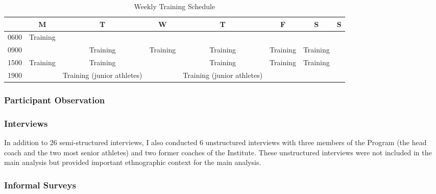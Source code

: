 \begin{CJK}{UTF8}{gbsn}
  \begin{landscape}
    \begin{table}[htpb]\caption{Weekly Training Schedule}
      \begin{center}
        \begin{small}
            \begin{tabular}{| c | c | c | c | c | c | c | c |}
              \hline
              & \bf M & \bf T & \bf W & \bf T & \bf F & \bf S & \bf S \\
              \hline
              0600 & Training &  &  & & & & \\
              \hline
              0900 &  & Training & Training & Training & Training & Training &  \\
                \hline
              1500 & Training & Training & & Training & Training & Training &  \\
                \hline
              1900 &  & Training (junior athletes) & & Training (junior athletes) & & & \\
                 \hline
            \end{tabular}
                \label{tab:tournamentData}
          \end{small}
        \end{center}
      \end{table}
  \end{landscape}
  \restoregeometry




\subsubsection{Participant Observation}

  \subsubsection{Interviews}

  In addition to 26 semi-structured interviews, I also conducted 6 unstructured interviews with three members of the Program (the head coach and the two most senior athletes) and two former coaches of the Institute.  These unstructured interviews were not included in the main analysis but provided important ethnographic context for the main analysis.

  \subsubsection{Informal Surveys}


\end{CJK}
